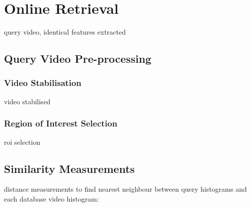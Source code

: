 



\section{Online Retrieval}

query video, identical features extracted

\subsection{Query Video Pre-processing}

\subsubsection{Video Stabilisation}

video stabilised

\subsubsection{Region of Interest Selection}

roi selection

\subsection{Similarity Measurements}

distance measurements to find nearest neighbour between query histograms and each database video histogram:

